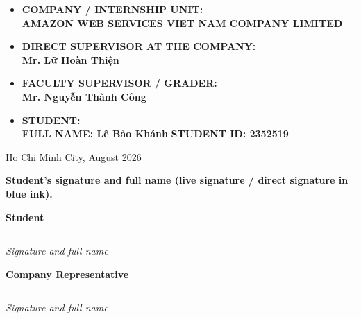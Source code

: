 \documentclass[a4paper]{article}
\begin{document}
\begin{titlepage}
\begin{itemize}
    \renewcommand\labelitemi{--}
    \setlength{\itemsep}{0.6cm}
    \item {\Large \textbf{COMPANY / INTERNSHIP UNIT:}\\[0.15cm]
          \textbf{AMAZON WEB SERVICES VIET NAM COMPANY LIMITED}}
    \item {\Large \textbf{DIRECT SUPERVISOR AT THE COMPANY:}\\[0.15cm]
          \textbf{Mr. Lữ Hoàn Thiện}}
    \item {\Large \textbf{FACULTY SUPERVISOR / GRADER:}\\[0.15cm]
          \textbf{Mr. Nguyễn Thành Công}}
    \item {\Large \textbf{STUDENT:}\\[0.3cm]
          \textbf{FULL NAME: Lê Bảo Khánh} \hspace{1.5cm} \textbf{STUDENT ID: 2352519}}
\end{itemize}
\vspace{0.5cm}
\begin{center}
{\Large Ho Chi Minh City, August 2026}
\end{center}
\end{titlepage}

\newpage
\tableofcontents
\newpage





\clearpage
\thispagestyle{fancy}

\vspace*{-1.0cm}

\noindent
\textbf{Student's signature and full name (live signature / direct signature in blue ink).}

\vspace{2.0cm}

\noindent
\begin{minipage}[t]{0.46\textwidth}
  \centering
  \textbf{Student}

  \vspace{4.5cm}

  \rule{0.85\linewidth}{0.4pt}

  \vspace{0.3cm}
  \textit{Signature and full name}
\end{minipage}
\hfill
\begin{minipage}[t]{0.46\textwidth}
  \centering
  \textbf{Company Representative}

  \vspace{4.5cm}

  \rule{0.85\linewidth}{0.4pt}

  \vspace{0.3cm}
  \textit{Signature and full name}
\end{minipage}
\end{document}
